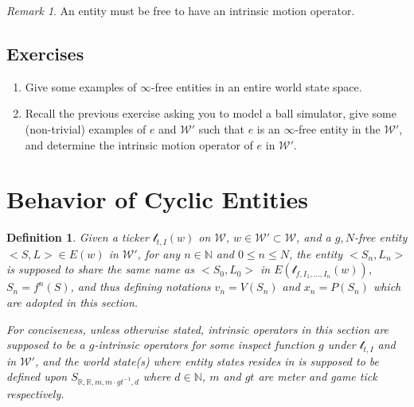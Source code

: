 \documentclass{book}
\newtheorem{definition}{Definition}
\theoremstyle{definition}\newtheorem{mechanism}{Mechanism}
\theoremstyle{remark}\newtheorem*{remark}{Remark}
\begin{document}
\begin{remark}
	An entity must be free to have an intrinsic motion operator.
\end{remark}

\subsection*{Exercises}

\begin{enumerate}
	\item Give some examples of $\infty$-free entities in an entire world state space.
	\item Recall the previous exercise asking you to model a ball simulator, give some (non-trivial) examples of $e$ and $\mathcal W'$ such that $e$ is an $\infty$-free entity in the $\mathcal W'$, and determine the intrinsic motion operator of $e$ in $\mathcal W'$.
\end{enumerate}


\section{Behavior of Cyclic Entities}

\begin{definition}
	Given a ticker $\mathcal t_{t, I}(w)$ on $\mathcal W$, $w\in \mathcal W'\subset \mathcal W$, and a $g, N$-free entity $<S, L>\in E(w)$ in $\mathcal W'$, for any $n\in \mathbb N$ and $0\le n\le N$, the entity $<S_n, L_n>$ is supposed to share the same name as $<S_0, L_0>$ in $E(\mathcal t_{f, I_1, \dots, I_n}(w))$, $S_n = f^n(S)$, and thus defining notations $v_n = V(S_n)$ and $x_n = P(S_n)$ which are adopted in this section.
	
	For conciseness, unless otherwise stated, intrinsic operators in this section are supposed to be a $g$-intrinsic operators for some inspect function $g$ under $\mathcal t_{t, I}$ and in $\mathcal W'$, and the world state(s) where entity states resides in is supposed to be defined upon $S_{\mathbb R, \mathbb R, m, m\cdot gt^{-1}, d}$ where $d\in \mathbb N$, $m$ and $gt$ are meter and game tick respectively.
\end{definition}
\end{document}
